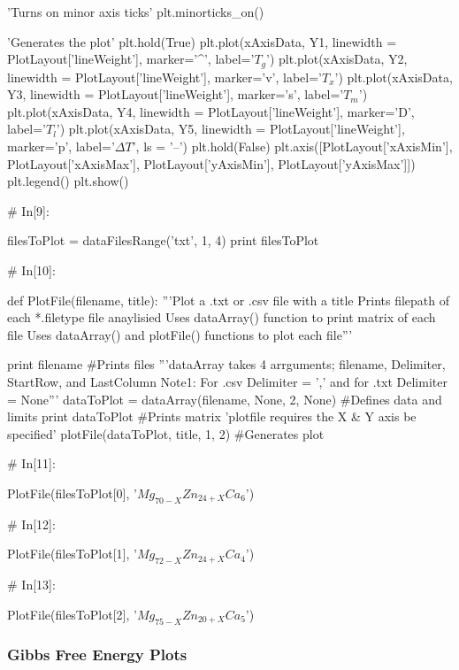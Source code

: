 \documentclass[a4paper,8pt]{article}
\begin{document}
\begin{python}
'Turns on minor axis ticks'
plt.minorticks_on()

'Generates the plot'
plt.hold(True)
plt.plot(xAxisData, Y1, linewidth = PlotLayout['lineWeight'],
marker='^', label='$T_{g}$')
plt.plot(xAxisData, Y2, linewidth = PlotLayout['lineWeight'],
marker='v', label='$T_{x}$')
plt.plot(xAxisData, Y3, linewidth = PlotLayout['lineWeight'],
marker='s', label='$T_{m}$')
plt.plot(xAxisData, Y4, linewidth = PlotLayout['lineWeight'],
marker='D', label='$T_{l}$')
plt.plot(xAxisData, Y5, linewidth = PlotLayout['lineWeight'],
marker='p', label='$\Delta T$', ls = '--')
plt.hold(False)
plt.axis([PlotLayout['xAxisMin'], PlotLayout['xAxisMax'], 
PlotLayout['yAxisMin'], PlotLayout['yAxisMax']])
plt.legend()
plt.show()


# In[9]:

filesToPlot = dataFilesRange('txt', 1, 4)
print filesToPlot


# In[10]:

def PlotFile(filename, title):
'''Plot a .txt or .csv file with a title
Prints filepath of each *.filetype file anaylisied 
Uses dataArray() function to print matrix of each file
Uses dataArray() and plotFile() functions to plot each file'''

print filename #Prints files
'''dataArray takes 4 arrguments; filename, Delimiter, StartRow, and LastColumn
Note1: For .csv Delimiter = ',' and for .txt Delimiter = None'''
dataToPlot = dataArray(filename, None, 2, None) #Defines data and limits
print dataToPlot #Prints matrix
'plotfile requires the X & Y axis be specified'
plotFile(dataToPlot, title, 1, 2) #Generates plot


# In[11]:

PlotFile(filesToPlot[0], '$Mg_{70-X}Zn_{24+X}Ca_{6}$')


# In[12]:

PlotFile(filesToPlot[1], '$Mg_{72-X}Zn_{24+X}Ca_{4}$')


# In[13]:

PlotFile(filesToPlot[2], '$Mg_{75-X}Zn_{20+X}Ca_{5}$')
\end{python}

\newpage
\subsubsection{Gibbs Free Energy Plots}
\end{document}
